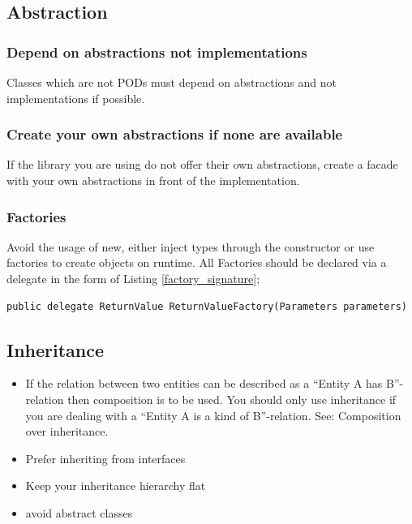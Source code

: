 \documentclass[11pt,a4paper]{article}
\begin{document}
\subsection{Abstraction}

\subsubsection{Depend on abstractions not implementations}

Classes which are not PODs must depend on abstractions and not implementations if possible.

\subsubsection{Create your own abstractions if none are available}

If the library you are using do not offer their own abstractions, create a facade with your own abstractions in front of the implementation.

\subsubsection{Factories}

Avoid the usage of new, either inject types through the constructor or use factories to create objects on runtime. All Factories should be declared via a delegate in the form of Listing \ref{factory_signature};

\begin{lstlisting}[language={[Sharp]C}, caption={Signature of factories},label={factory_signature}]
public delegate ReturnValue ReturnValueFactory(Parameters parameters)
\end{lstlisting}


\subsection{Inheritance}

\begin{itemize}[itemsep=0pt]
    \item If the relation between two entities can be described as a \enquote{Entity A has B}-relation then composition is to be used. You should only use inheritance if you are dealing with a \enquote{Entity A is a kind of B}-relation. See: Composition over inheritance.
    \item Prefer inheriting from interfaces
    \item Keep your inheritance hierarchy flat
		\item avoid abstract classes
\end{itemize}
\end{document}
